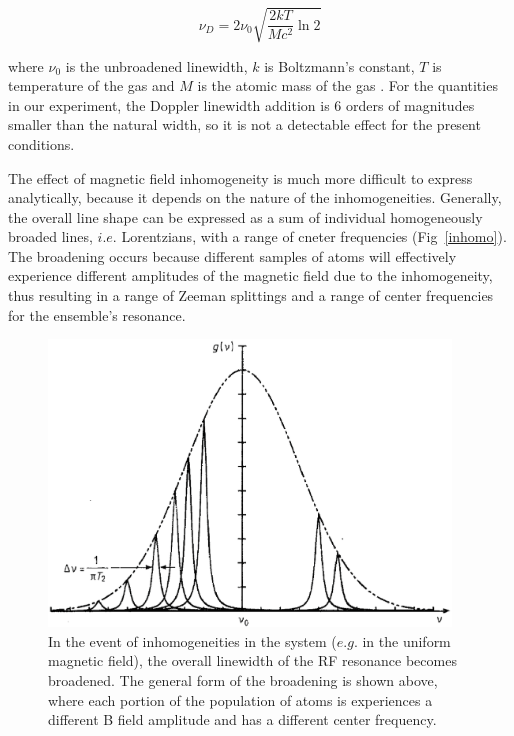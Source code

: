 \begin{equation}
\nu_D = 2\nu_0\sqrt{\frac{2 k T}{M c^2}\ln{2}}
\end{equation}

where $\nu_0$ is the unbroadened linewidth, $k$ is Boltzmann's
constant, $T$ is temperature of the gas and $M$ is the atomic mass of
the gas \cite{yariv}. For the quantities in our experiment, the
Doppler linewidth addition is $6$ orders of magnitudes smaller than
the natural width, so it is not a detectable effect for the present
conditions.

The effect of magnetic field inhomogeneity is much more difficult to
express analytically, because it depends on the nature of the
inhomogeneities. Generally, the overall line shape can be expressed as
a sum of individual homogeneously broaded lines, $i.e.$ Lorentzians,
with a range of cneter frequencies
(Fig~\ref{inhomo})\cite{vanier}. The broadening occurs because
different samples of atoms will effectively experience different
amplitudes of the magnetic field due to the inhomogeneity, thus
resulting in a range of Zeeman splittings and a range of center
frequencies for the ensemble's resonance.

\begin{figure}[h]
\begin{center}
\includegraphics[height=3in]{figures/inhomogeneous.eps}
\caption{\small{In the event of inhomogeneities in the system ($e.g.$ in the uniform magnetic field), the overall linewidth of the RF resonance becomes broadened. The general form of the broadening is shown above, where each portion of the population of atoms is experiences a different B field amplitude and has a different center frequency.}}
\label{fig:inhomo}
\end{center}
\end{figure}


